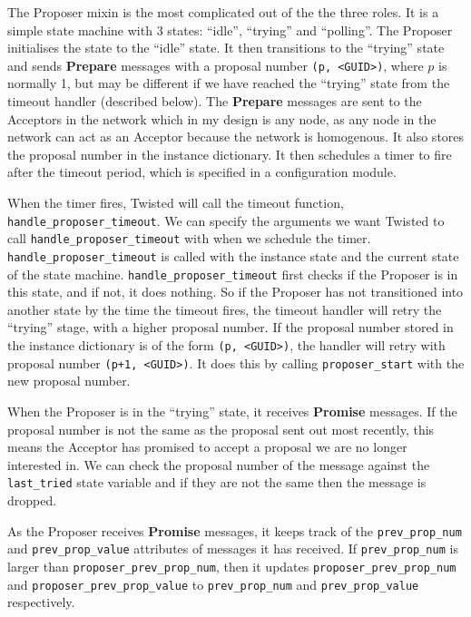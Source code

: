 \documentclass[12pt,twoside,notitlepage]{report}
\newcommand{\msg}[1] {{\bf #1}}         %
\begin{document}
The Proposer mixin is the most complicated out of the the three roles. It is a simple state
machine with 3 states: ``idle'', ``trying'' and ``polling''. The Proposer initialises the state to
the ``idle'' state. It then transitions to the ``trying'' state and sends \msg{Prepare} messages
with a proposal number \verb+(p, <GUID>)+, where $p$ is normally 1, but may be different if we
have reached the ``trying'' state from the timeout handler (described below). The \msg{Prepare}
messages are sent to the Acceptors in the network which in my design is any node, as any node in
the network can act as an Acceptor because the network is homogenous. It also stores the proposal
number in the instance dictionary. It then schedules a timer to fire after the timeout period,
which is specified in a configuration module.

When the timer fires, Twisted will call the timeout function, \verb+handle_proposer_timeout+. We
can specify the arguments we want Twisted to call \verb+handle_proposer_timeout+ with when we
schedule the timer. \verb+handle_proposer_timeout+ is called with the instance state and the
current state of the state machine. \verb+handle_proposer_timeout+ first checks if the Proposer is
in this state, and if not, it does nothing. So if the Proposer has not transitioned into another
state by the time the timeout fires, the timeout handler will retry the ``trying'' stage, with a
higher proposal number. If the proposal number stored in the instance dictionary is of the form
\verb+(p, <GUID>)+, the handler will retry with proposal number \verb$(p+1, <GUID>)$. It does this
by calling \verb+proposer_start+ with the new proposal number.

When the Proposer is in the ``trying'' state, it receives \msg{Promise} messages. If the proposal
number is not the same as the proposal sent out most recently, this means the Acceptor has
promised to accept a proposal we are no longer interested in. We can check the proposal number of
the message against the \verb+last_tried+ state variable and if they are not the same then the
message is dropped.

As the Proposer receives \msg{Promise} messages, it keeps track of the \verb+prev_prop_num+ and
\verb+prev_prop_value+ attributes of messages it has received. If \verb+prev_prop_num+ is larger
than \verb+proposer_prev_prop_num+, then it updates \verb+proposer_prev_prop_num+
and \verb+proposer_prev_prop_value+ to \verb+prev_prop_num+ and \verb+prev_prop_value+
respectively.
\end{document}
